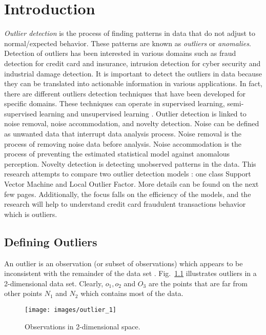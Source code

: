 \chapter{Introduction}
\textit{Outlier detection} is the process of finding patterns in data that do not adjust to normal/expected behavior. These patterns are known as \textit{outliers} or \textit{anomalies}\citep{Survey}. Detection of outliers has been interested in various domains such as fraud detection for credit card and insurance, intrusion detection for cyber security and industrial damage detection.
It is important to detect the outliers in data because they can be translated into actionable information in various applications. In fact, there are different outliers detection techniques that have been developed for specific domains. These techniques can operate in supervised learning, semi-supervised learning and unsupervised learning \citep{Kurukshetra}. Outlier detection is linked to noise removal, noise accommodation, and novelty detection\citep{Kurukshetra}. Noise can be defined as unwanted data that interrupt data analysis process. Noise removal is the process of removing noise data before analysis. Noise accommodation is the process of preventing the estimated statistical model against anomalous perception. Novelty detection is detecting unobserved patterns in the data. This research attempts to compare two outlier detection models \citep{Silvia}: one class Support Vector Machine and Local Outlier Factor. More details can be found on the next few pages. Additionally, the focus falls on the efficiency of the models, and the research will help to understand credit card fraudulent transactions behavior which is outliers.
\section{Defining Outliers}
An outlier is an observation (or subset of observations) which appears to be
inconsistent with the remainder of the data set \citep{Barnett}. Fig.~\ref{outlier} illustrates outliers in a 2-dimensional data set. Clearly, $o_1,o_2$ and $O_3$ are the points that are far from other points $N_1$ and $N_2$ which contains most of the data.
\begin{figure}[!h]
\centering 
\texttt{[image: images/outlier\_1]}
\caption{Observations in 2-dimensional space\citep{Kurukshetra}.}
\label{outlier} 
\end{figure}
\begin{comment}
\begin{figure}[!htb]
\minipage{0.32\textwidth}
  \texttt{[image: images/O1-1]}
  \caption{A really Awesome Image}\label{fig:awesome_image1}
\endminipage\hfill
\minipage{0.32\textwidth}
  \texttt{[image: images/O2]}
  \caption{A really Awesome Image}\label{fig:awesome_image2}
\endminipage\hfill
\minipage{0.32\textwidth}%
  \texttt{[image: images/O3]}
  \caption{A really Awesome Image}\label{fig:awesome_image3}
\endminipage
\end{figure}
\end{comment}

